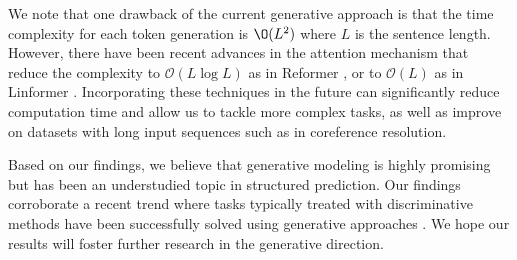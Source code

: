 We note that one drawback of the current generative approach is that the time complexity for each token generation is $\O(L^2)$ where $L$ is the sentence length. %
However, there have been recent advances in the attention mechanism that reduce the complexity to $\mathcal{O}(L \log L)$ as in Reformer \citep{reformer}, or to $\mathcal{O}(L)$ as in Linformer \citep{linformer}.
Incorporating these techniques in the future can significantly reduce computation time and allow us to tackle more complex tasks, as well as improve on datasets with long input sequences such as in coreference resolution.

Based on our findings, we believe that generative modeling is highly promising but has been an understudied topic in structured prediction.
Our findings corroborate a recent trend where tasks typically treated with discriminative methods have been successfully solved using generative approaches \citep{gpt3,fusion_in_decoder,small_lm_fewshot}.
We hope our results will foster further research in the generative direction.

 

    
    

    

    

    
    

    

    

    
    
    

\clearpage

